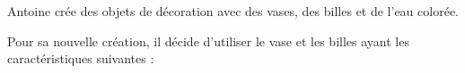 \documentclass[10pt]{article}
\begin{document}
\setlength\parindent{0mm}
\pagestyle{fancy}
\thispagestyle{empty}
    
    
    




\medskip 

Antoine crée des objets de décoration avec des vases, des billes et de l'eau colorée. 

Pour sa nouvelle création, il décide d'utiliser le vase et les billes ayant les caractéristiques suivantes : 
\end{document}
